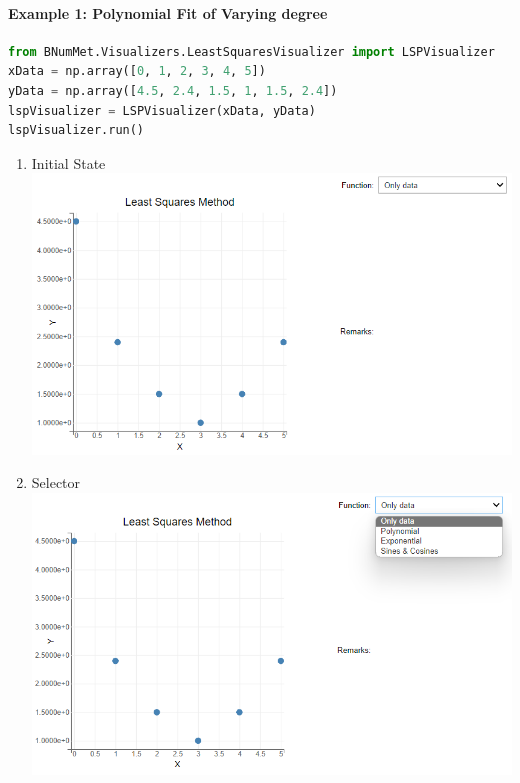 \paragraph{Example 1: Polynomial Fit of Varying degree}{
\begin{lstlisting}[language=Python]
from BNumMet.Visualizers.LeastSquaresVisualizer import LSPVisualizer
xData = np.array([0, 1, 2, 3, 4, 5])
yData = np.array([4.5, 2.4, 1.5, 1, 1.5, 2.4])
lspVisualizer = LSPVisualizer(xData, yData)
lspVisualizer.run()
\end{lstlisting}

\begin{enumerate}
    \item Initial State\\
    \includegraphics[scale=0.6]{Include/Images/Thesis/Documentation/Visualizers/LeastSquares/Example 1/Example 1 - 00 - Initial State.png}
    \item Selector\\
    \includegraphics[scale=0.6]{Include/Images/Thesis/Documentation/Visualizers/LeastSquares/Example 1/Example 1 - 00 - Selector.png}

\end{enumerate}}
